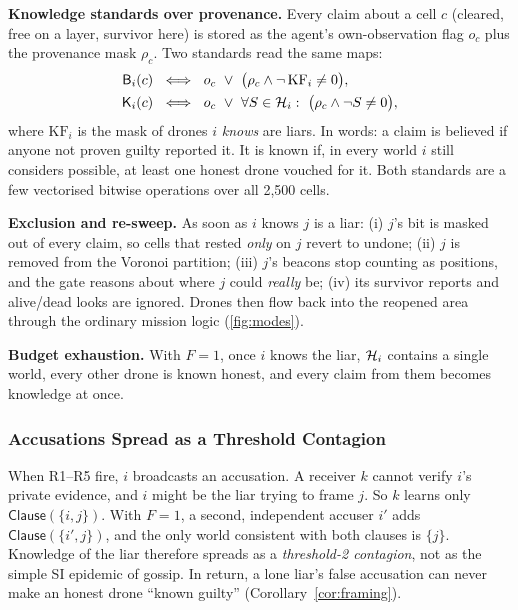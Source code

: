 \textbf{Knowledge standards over provenance.} Every claim about a cell $c$ (cleared, free on a layer, survivor here) is
stored as the agent's own-observation flag $o_c$ plus the provenance mask $\rho_c$. Two standards read the same maps:
\begin{align}
    \Bl_i(c)\ &\iff\ o_c \ \lor\ \big(\rho_c \wedge \neg\, \mathrm{KF}_i \neq 0\big), \label{eq:belief}\\
    \Kn_i(c)\ &\iff\ o_c \ \lor\ \forall S\in\Hyp_i:\ \big(\rho_c\wedge\neg S\neq 0\big), \label{eq:knowledge}
\end{align}
where $\mathrm{KF}_i$ is the mask of drones $i$ \emph{knows} are liars. In words: a claim is believed if anyone not
proven guilty reported it. It is known if, in every world $i$ still considers possible, at least one honest drone
vouched for it. Both standards are a few vectorised bitwise operations over all 2,500 cells.

\textbf{Exclusion and re-sweep.} As soon as $i$ knows $j$ is a liar: (i) $j$'s bit is masked out of every claim, so
cells that rested \emph{only} on $j$ revert to undone; (ii) $j$ is removed from the Voronoi partition; (iii) $j$'s beacons
stop counting as positions, and the gate reasons about where $j$ could \emph{really} be; (iv) its survivor reports and
alive/dead looks are ignored. Drones then flow back into the reopened area through the ordinary mission logic
(\autoref{fig:modes}).

\textbf{Budget exhaustion.} With $F=1$, once $i$ knows the liar, $\mathcal{H}_i$ contains a single world, every other drone is
known honest, and every claim from them becomes knowledge at once.

\subsubsection{Accusations Spread as a Threshold Contagion}
\label{sec:accusations}

When R1--R5 fire, $i$ broadcasts an accusation. A receiver $k$ cannot verify $i$'s private evidence, and $i$ might be
the liar trying to frame $j$. So $k$ learns only $\mathsf{Clause}(\{i,j\})$. With $F=1$, a second, independent accuser
$i'$ adds $\mathsf{Clause}(\{i',j\})$, and the only world consistent with both clauses is $\{j\}$. Knowledge of the
liar therefore spreads as a \emph{threshold-2 contagion}, not as the simple SI epidemic of gossip. In return, a lone
liar's false accusation can never make an honest drone ``known guilty'' (Corollary~\ref{cor:framing}).

